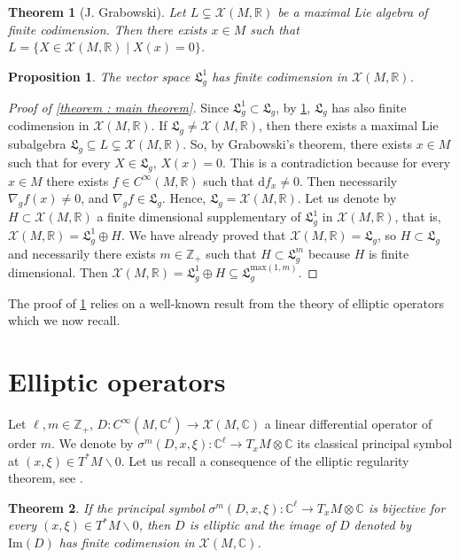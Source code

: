 \documentclass[10pt]{article}
\newcommand{\C}{{\mathbb C}}
\newcommand{\R}{{\mathbb R}}
\newcommand{\Z}{{\mathbb Z}}
\newcommand{\Chi}{{\mathcal X}}
\newcommand{\LL}{{\mathfrak L}}
\newtheorem{theorem}{Theorem}
\newtheorem{prop}{Proposition}
\begin{document}
\begin{theorem}[J. Grabowski] \label{theorem : Grabowski}
    Let $L\subsetneq\Chi(M,\R)$ be a maximal Lie algebra of finite codimension. Then there exists $x\in M$ such that $L=\{X\in \Chi(M,\R)\mid X(x)=0\}$.
\end{theorem}

\begin{prop} \label{theorem : finite codimension}
    The vector space $\LL_g^1$ has finite codimension in $\Chi(M,\R)$.
\end{prop}

\begin{proof}[Proof of \cref{theorem : main theorem}]
    Since $\LL_g^1 \subset \LL_g$, by \cref{theorem : finite codimension}, $\LL_g$ has also finite codimension in $\Chi(M,\R)$.
    If $\LL_g\neq \Chi(M,\R)$, then there exists a maximal Lie subalgebra $\LL_g\subseteq L\subsetneq \Chi(M,\R)$.
    So, by Grabowski's theorem, there exists $x\in M$ such that for every $X\in \LL_g$, $X(x)=0$.
    This is a contradiction because for every $x\in M$ there exists $f \in C^\infty(M,\R)$ such that $\mathrm{d}f_x\neq 0$. Then necessarily $\nabla_gf(x)\neq 0$, and $\nabla_gf\in \LL_g$.
    Hence, $\LL_g=\Chi(M,\R)$.
    Let us denote by $H \subset \Chi(M,\R)$ a finite dimensional supplementary of $\LL_g^1$ in $\Chi(M,\R)$, that is, $\Chi(M,\R)=\LL_g^1\oplus H$. We have already proved that $\Chi(M,\R)=\LL_g$, so $H\subset \LL_g$ and necessarily there exists $m\in \Z_+$ such that $H \subset \LL_g^m$ because $H$ is finite dimensional. Then $\Chi(M,\R)=\LL_g^1\oplus H \subseteq \LL_g^{\mathrm{max}(1,m)}$.
\end{proof}

The proof of \cref{theorem : finite codimension} relies on a well-known result from the theory of elliptic operators which we now recall.

\section{Elliptic operators}\label{sec:elliptic}

Let $\ell,m \in \Z_+$, $D : C^{\infty}(M,\C^\ell) \rightarrow \Chi(M,\C)$ a linear differential operator of order $m$. We denote by $\sigma^m(D,x,\xi):\C^\ell\to T_xM\otimes \C$ its classical principal symbol at $(x,\xi)\in T^*M\backslash 0$.
Let us recall a consequence of the elliptic regularity theorem, see \cite[Chapter 18]{hormander}.
\begin{theorem}
    If the principal symbol $\sigma^m(D,x,\xi): \C^\ell \rightarrow T_xM\otimes \C$ is bijective for every $(x,\xi)\in T^*M\backslash 0$, then $D$ is elliptic and the image of $D$ denoted by $\mathrm{Im}(D)$ has finite codimension in $\Chi(M,\C)$.
\end{theorem}
\end{document}
